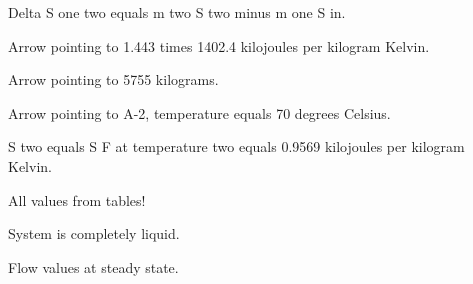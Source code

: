 Delta S one two equals m two S two minus m one S in.  

Arrow pointing to 1.443 times 1402.4 kilojoules per kilogram Kelvin.  

Arrow pointing to 5755 kilograms.  

Arrow pointing to A-2, temperature equals 70 degrees Celsius.  

S two equals S F at temperature two equals 0.9569 kilojoules per kilogram Kelvin.  

All values from tables!  

System is completely liquid.  

Flow values at steady state.